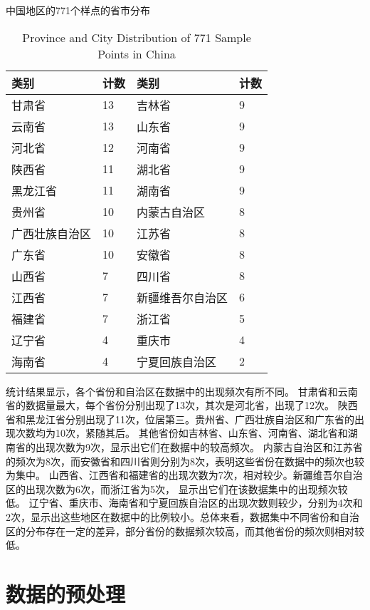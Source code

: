 \documentclass[AutoFakeBold]{LZUThesis-PgD&PhD}
\begin{document}
	\begin{table}[H]
		\centering
		\caption{中国地区的771个样点的省市分布}
		\caption*{Province and City Distribution of 771 Sample Points in China}
		\begin{tabular}{ll|ll}
			\toprule
			\textbf{类别} & \textbf{计数} & \textbf{类别} & \textbf{计数} \\
			\midrule
			甘肃省 & 13 & 吉林省 & 9 \\
			云南省 & 13 & 山东省 & 9 \\
			河北省 & 12 & 河南省 & 9 \\
			陕西省 & 11 & 湖北省 & 9 \\
			黑龙江省 & 11 & 湖南省 & 9 \\
			贵州省 & 10 & 内蒙古自治区 & 8 \\
			广西壮族自治区 & 10 & 江苏省 & 8 \\
			广东省 & 10 & 安徽省 & 8 \\
			山西省 & 7 & 四川省 & 8 \\
			江西省 & 7 & 新疆维吾尔自治区 & 6 \\
			福建省 & 7 & 浙江省 & 5 \\
			辽宁省 & 4 & 重庆市 & 4 \\
			海南省 & 4 & 宁夏回族自治区 & 2 \\
			\bottomrule
		\end{tabular}
		
		\label{tab:category_count}
	\end{table}
	
	
	统计结果显示，各个省份和自治区在数据中的出现频次有所不同。
	甘肃省和云南省的数据量最大，每个省份分别出现了13次，其次是河北省，出现了12次。
	陕西省和黑龙江省分别出现了11次，位居第三。贵州省、广西壮族自治区和广东省的出现次数均为10次，紧随其后。
	其他省份如吉林省、山东省、河南省、湖北省和湖南省的出现次数为9次，显示出它们在数据中的较高频次。
	内蒙古自治区和江苏省的频次为8次，而安徽省和四川省则分别为8次，表明这些省份在数据中的频次也较为集中。
	山西省、江西省和福建省的出现次数为7次，相对较少。新疆维吾尔自治区的出现次数为6次，而浙江省为5次，
	显示出它们在该数据集中的出现频次较低。
	辽宁省、重庆市、海南省和宁夏回族自治区的出现次数则较少，分别为4次和2次，显示出这些地区在数据中的比例较小。总体来看，数据集中不同省份和自治区的分布存在一定的差异，部分省份的数据频次较高，而其他省份的频次则相对较低。
	
	
	\section{数据的预处理}
	
\end{document}
